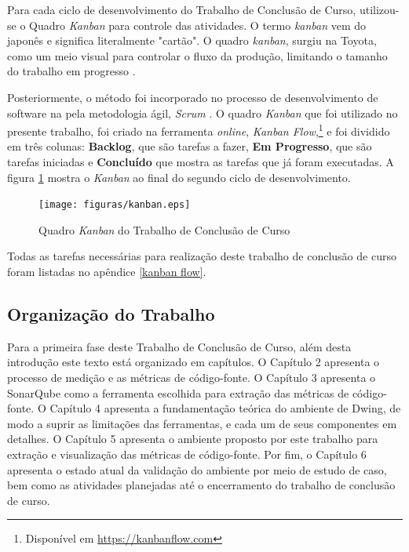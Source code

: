Para cada ciclo de desenvolvimento do Trabalho de Conclusão de Curso,  
utilizou-se o Quadro \textit{Kanban} para controle das atividades. 
O termo \textit{kanban} vem do japonês e significa literalmente "cartão". 
O quadro \textit{kanban}, surgiu na Toyota, como um meio visual para controlar o 
fluxo da produção, limitando o tamanho do trabalho em progresso 
\cite{moura1999kanban}.

Posteriormente, o método foi incorporado no processo de desenvolvimento de 
software na  pela metodologia ágil, \textit{Scrum} \cite{Schwaber:2004}. 
O quadro \textit{Kanban} 
que foi utilizado no presente trabalho, foi criado na ferramenta \textit{online}, 
\textit{Kanban Flow},\footnote{Disponível em \url{https://kanbanflow.com}} e foi
 dividido em três colunas: \textbf{Backlog}, que são tarefas a fazer, 
\textbf{Em Progresso}, que são tarefas iniciadas e \textbf{Concluído} que mostra
 as tarefas que já foram executadas. A figura \ref{kanban} mostra o 
 \textit{Kanban} ao final do segundo ciclo de 
desenvolvimento.

\begin{figure}[h]
\centering
	\texttt{[image: figuras/kanban.eps]}
	\caption{Quadro \textit{Kanban} do Trabalho de Conclusão de Curso}
	\label{kanban}
\end{figure}

Todas as tarefas necessárias para realização deste trabalho de conclusão de 
curso foram listadas no apêndice \ref{kanban flow}. 


\subsection{Organização do Trabalho}
Para a primeira fase deste Trabalho de Conclusão de Curso, além desta introdução 
este texto está organizado em capítulos. O Capítulo 2 apresenta  o processo de 
medição e as métricas de código-fonte.
O Capítulo 3 apresenta o SonarQube como a ferramenta escolhida para extração das 
métricas de código-fonte.
O Capítulo 4 apresenta a fundamentação teórica do ambiente de Dwing, de modo a 
suprir as limitações das ferramentas, e cada um de seus componentes em detalhes. 
O Capítulo 5 apresenta o ambiente proposto por este trabalho para extração e 
visualização das métricas de código-fonte. Por fim, o Capítulo 6 apresenta o 
estado atual da validação 
do ambiente por meio de estudo de caso, bem como as atividades planejadas até o 
encerramento do trabalho de conclusão de curso.
